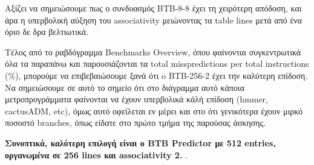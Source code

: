    Αξίζει να σημειώσουμε πως ο συνδυασμός BTB-8-8 έχει τη χειρότερη απόδοση, και
   άρα η υπερβολική αύξηση του associativity μειώνοντας τα table lines μετά από
   ένα όριο δε δρα βελτιωτικά.
  
   Τέλος από το ραβδόγραμμα Benchmarks Overview, όπου φαίνονται συγκεντρωτικά
   όλα τα παραπάνω και παρουσιάζονται τα total misspredictions per total
   instructions (\%), μπορούμε να επιβεβαιώσουμε ξανά ότι o BTB-256-2 έχει την
   καλύτερη επίδοση. Να σημειώσουμε σε αυτό το σημείο ότι στο διάγραμμα αυτό
   κάποια μετροπρογράμματα φαίνονται να έχουν υπερβολικά κάλή επίδοση (hmmer,
   cactusADM, etc), όμως αυτό οφείλεται εν μέρει και στο ότι γενικότερα έχουν
   μιρκό ποσοστό branches, όπως είδατε στο πρώτο τμήμα της παρούσας άσκησης.
   
   \textbf{Συνοπτικά, καλύτερη επιλογή είναι ο BTB Predictor με 512 entries, οργανωμένα σε 256 lines και associativity 2. }.

